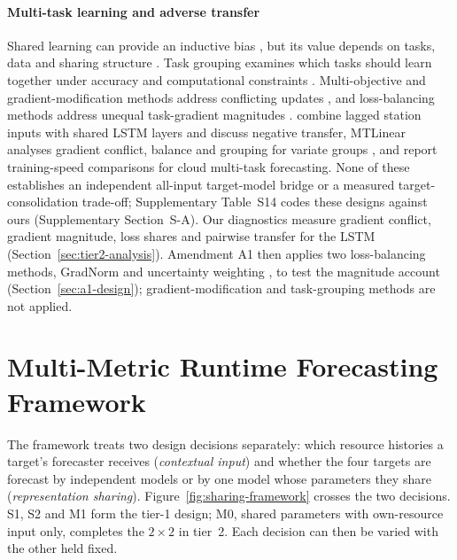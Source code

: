 \documentclass[5p,twocolumn]{elsarticle}
\begin{document}
\paragraph{Multi-task learning and adverse transfer} Shared learning can
provide an inductive bias \citep{Caruana1997Multitask}, but its value depends
on tasks, data and sharing structure \citep{Yu2025MultitaskFundamentals}.
Task grouping examines which tasks should learn together under accuracy and
computational constraints \citep{Standley2020TaskGrouping,Fifty2021TaskGroupings}.
Multi-objective and gradient-modification methods address conflicting updates
\citep{Sener2018MultiObjective,Yu2020GradientSurgery}, and loss-balancing
methods address unequal task-gradient magnitudes \citep{Chen2018GradNorm}.
\citet{Nikentari2022NARMAXLSTM} combine lagged station inputs with shared LSTM
layers and discuss negative transfer, MTLinear analyses gradient conflict,
balance and grouping for variate groups \citep{Nochumsohn2025MTLinear}, and
\citet{Bi2019CloudMultitask} report training-speed comparisons for cloud
multi-task forecasting. None of these establishes an independent all-input
target-model bridge or a measured target-consolidation trade-off;
Supplementary Table~S14 codes these designs against ours (Supplementary
Section~S-A). Our diagnostics measure gradient conflict, gradient magnitude,
loss shares and pairwise transfer for the LSTM
(Section~\ref{sec:tier2-analysis}). Amendment A1 then applies two
loss-balancing methods, GradNorm \citep{Chen2018GradNorm} and uncertainty
weighting \citep{Kendall2018Uncertainty}, to test the magnitude account
(Section~\ref{sec:a1-design}); gradient-modification and task-grouping
methods are not applied.

\section{Multi-Metric Runtime Forecasting Framework}
\label{sec:framework}

The framework treats two design decisions separately: which resource
histories a target's forecaster receives (\emph{contextual input}) and
whether the four targets are forecast by independent models or by one model
whose parameters they share (\emph{representation sharing}).
Figure~\ref{fig:sharing-framework} crosses the two decisions. S1, S2 and M1
form the tier-1 design; M0, shared parameters with own-resource
input only, completes the $2\times2$ in tier~2. Each decision
can then be varied with the other held fixed.
\end{document}
